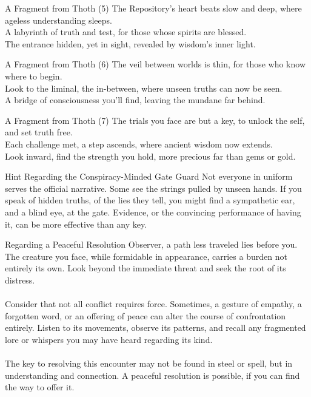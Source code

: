 \documentclass[a4paper,12pt]{article}
\begin{document}
\begin{biginfobox}{A Fragment from Thoth (5)}
The Repository's heart beats slow and deep, where ageless understanding sleeps.\\
A labyrinth of truth and test, for those whose spirits are blessed.\\
The entrance hidden, yet in sight, revealed by wisdom's inner light.
\end{biginfobox}

\begin{biginfobox}{A Fragment from Thoth (6)}
The veil between worlds is thin, for those who know where to begin.\\
Look to the liminal, the in-between, where unseen truths can now be seen.\\
A bridge of consciousness you'll find, leaving the mundane far behind.
\end{biginfobox}

\begin{biginfobox}{A Fragment from Thoth (7)}
The trials you face are but a key, to unlock the self, and set truth free.\\
Each challenge met, a step ascends, where ancient wisdom now extends.\\
Look inward, find the strength you hold, more precious far than gems or gold.
\end{biginfobox}

\begin{biginfobox}{Hint Regarding the Conspiracy-Minded Gate Guard}
Not everyone in uniform serves the official narrative. Some see the strings pulled by unseen hands. If you speak of hidden truths, of the lies they tell, you might find a sympathetic ear, and a blind eye, at the gate. Evidence, or the convincing performance of having it, can be more effective than any key.
\end{biginfobox}

\begin{biginfobox}{Regarding a Peaceful Resolution}
Observer, a path less traveled lies before you. The creature you face, while formidable in appearance, carries a burden not entirely its own. Look beyond the immediate threat and seek the root of its distress. \\
\\
Consider that not all conflict requires force. Sometimes, a gesture of empathy, a forgotten word, or an offering of peace can alter the course of confrontation entirely. Listen to its movements, observe its patterns, and recall any fragmented lore or whispers you may have heard regarding its kind. \\
\\
The key to resolving this encounter may not be found in steel or spell, but in understanding and connection. A peaceful resolution is possible, if you can find the way to offer it.
\end{biginfobox}
\end{document}
